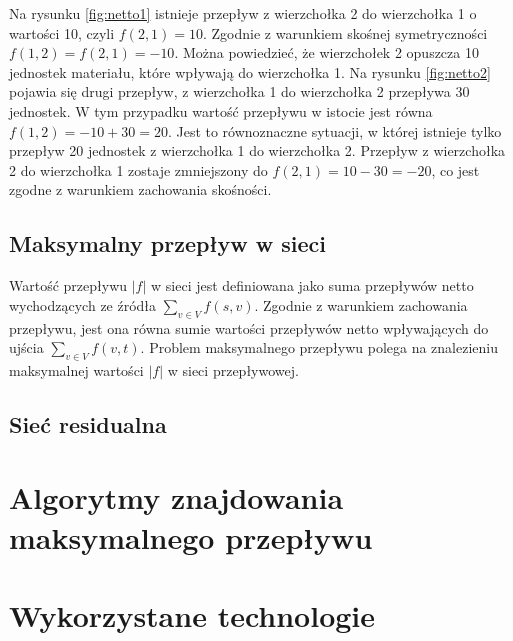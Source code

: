 Na rysunku \ref{fig:netto1} istnieje przepływ z wierzchołka 2 do wierzchołka 1 o wartości 10, czyli $ f(2, 1) = 10 $. Zgodnie z warunkiem skośnej symetryczności $ f(1, 2) = f(2, 1) = -10 $. Można powiedzieć, że wierzchołek 2 opuszcza 10 jednostek materiału, które wpływają do wierzchołka 1. Na rysunku \ref{fig:netto2} pojawia się drugi przepływ, z wierzchołka 1 do wierzchołka 2 przepływa 30 jednostek. W tym przypadku wartość przepływu w istocie jest równa $ f(1,2)=-10 + 30=20 $. Jest to równoznaczne sytuacji, w której istnieje tylko przepływ 20 jednostek z wierzchołka 1 do wierzchołka 2. Przepływ z wierzchołka 2 do wierzchołka 1 zostaje zmniejszony do $ f(2, 1)=10-30=-20 $, co jest zgodne z warunkiem zachowania skośności.
\subsection{Maksymalny przepływ w sieci}
Wartość przepływu $ |f| $ w sieci jest definiowana jako suma przepływów netto wychodzących ze źródła $ \sum_{v\in V}{f(s, v)} $. Zgodnie z warunkiem zachowania przepływu, jest ona równa sumie wartości przepływów netto wpływających do ujścia $ \sum_{v\in V}{f(v, t)} $. Problem maksymalnego przepływu polega na znalezieniu maksymalnej wartości $ |f| $ w sieci przepływowej.\cite{id:ZaawansowaneAlgorytmyStruktury}
\subsection{Sieć residualna}
\section{Algorytmy znajdowania maksymalnego przepływu}
\section{Wykorzystane technologie}